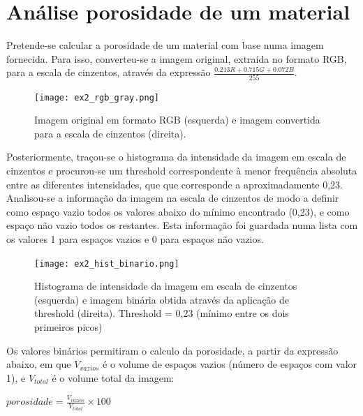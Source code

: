 \documentclass[aps,pre,twocolumn,showpacs,amsmath,amssymb]{revtex4-1}
\begin{document}
\section{Análise porosidade de um material}

    Pretende-se calcular a porosidade de um material com base numa imagem fornecida. Para isso, converteu-se a imagem original, extraída no formato RGB, para a escala de cinzentos, através da expressão $\frac{0.213R+0.715G+0.072B}{255}$.

    \begin{figure}[htb!]
        \begin{center}
            \texttt{[image: ex2\_rgb\_gray.png]} \\
            \caption{Imagem original em formato RGB (esquerda) e imagem convertida para a escala de cinzentos (direita).}
            \label{fig.exemplo}
        \end{center}
    \end{figure}

    Posteriormente, traçou-se o histograma da intensidade da imagem em escala de cinzentos e procurou-se um threshold correspondente à menor frequência absoluta entre as diferentes intensidades, que que corresponde a aproximadamente 0,23. Analisou-se a informação da imagem na escala de cinzentos de modo a definir como espaço vazio todos os valores abaixo do mínimo encontrado (0,23), e como espaço não vazio todos os restantes. Esta informação foi guardada numa lista com os valores 1 para espaços vazios e 0 para espaços não vazios.

    \begin{figure}[hbt!]
        \begin{center}
            \texttt{[image: ex2\_hist\_binario.png]} \\
            \caption{Histograma de intensidade da imagem em escala de cinzentos (esquerda) e imagem binária obtida através da aplicação de threshold (direita). Threshold = 0,23 (mínimo entre os dois primeiros picos)}
            \label{fig.exemplo}
        \end{center}
    \end{figure}

    Os valores binários permitiram o calculo da porosidade, a partir da expressão abaixo, em que $V_{vazios}$ é o volume de espaços vazios (número de espaços com valor 1), e $V_{total}$ é o volume total da imagem:

    \begin{center}
        $porosidade = \frac{V_{vazios}}{V_{total}} \times 100$
    \end{center}
\end{document}
